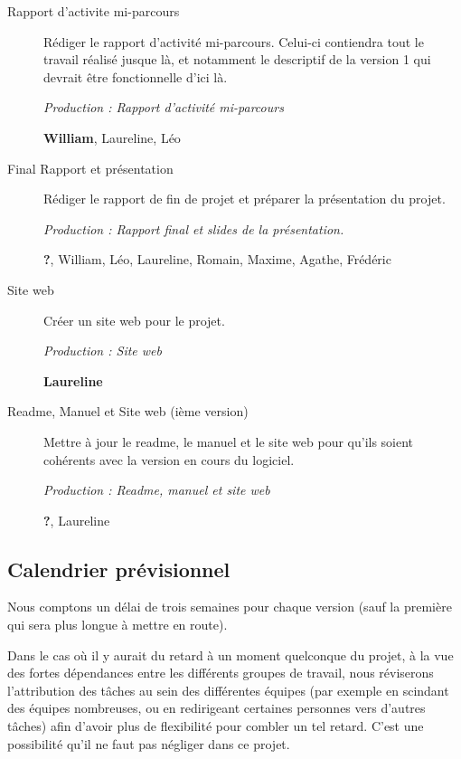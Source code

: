 \documentclass{article}
\begin{document}
\begin{description}
\begin{description}
  \item[Rapport d'activite mi-parcours] Rédiger le rapport d'activité mi-parcours. Celui-ci contiendra tout le travail réalisé jusque là, 
et notamment le descriptif de la version 1 qui devrait être fonctionnelle d'ici là.

    \textit{Production : Rapport d'activité mi-parcours}

    \textbf{William}, Laureline, Léo

  \item[Final Rapport et présentation] Rédiger le rapport de fin de projet et préparer la présentation du projet.

    \textit{Production : Rapport final et slides de la présentation.}

    \textbf{?}, William, Léo, Laureline, Romain, Maxime, Agathe, Frédéric

  \item[Site web] Créer un site web pour le projet. %

    \textit{Production : Site web}

    \textbf{Laureline}

  \item[Readme, Manuel et Site web (ième version)] Mettre à jour le readme, le manuel et le site web pour qu'ils soient cohérents avec la 
version en cours du logiciel.

    \textit{Production : Readme, manuel et site web}

    \textbf{?}, Laureline
  \end{description}

\medskip

\end{description}


\subsection{\label{calendrier}Calendrier prévisionnel}

Nous comptons un délai de trois semaines pour chaque version (sauf la première qui sera plus longue à mettre en route).

Dans le cas où il y aurait du retard à un moment quelconque du projet, à la vue des fortes dépendances entre les différents groupes de 
travail, nous réviserons l'attribution des tâches au sein des différentes équipes (par exemple en scindant des équipes nombreuses, ou en 
redirigeant certaines personnes vers d'autres tâches) afin d'avoir plus de flexibilité pour combler un tel retard. C'est une possibilité 
qu'il ne faut pas négliger dans ce projet.
\end{document}
